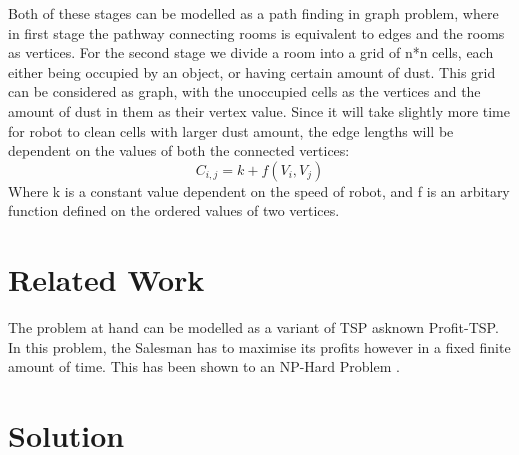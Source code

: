 \documentclass{article}
\begin{document}
Both of these stages can be modelled as a path finding in graph problem, where in first stage the pathway connecting rooms is equivalent to edges and the rooms as vertices.
For the second stage we divide a room into a grid of n*n cells, each either being occupied by an object, or having certain amount of dust. This grid can be considered as graph,
with the unoccupied cells as the vertices and the amount of dust in them as their vertex value. Since it will take slightly more time for robot to clean cells with larger dust amount,
the edge lengths will be dependent on the values of both the connected vertices:
\begin{equation}
    C_{i,j} = k + f(V_i,V_j)
\end{equation}
Where k is a constant value dependent on the speed of robot, and f is an arbitary function defined on the ordered values of two vertices.




\section{Related Work}

The problem at hand can be modelled as a variant of TSP  asknown Profit-TSP. In this problem,
the Salesman has to maximise its profits however in a fixed finite amount of time. 
This has been shown to an NP-Hard Problem \cite{ref1}. 


\section{Solution}
\end{document}

